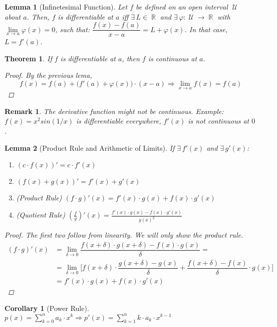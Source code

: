 \documentclass[12pt]{article}
\let\RA\Rightarrow
\DeclareMathOperator{\R}{\mathbb{R}}
\DeclareMathOperator{\U}{\mathcal{U}}
\newtheorem{theorem}{Theorem}[subsection]
\newtheorem{lemma}{Lemma}[subsection]
\newtheorem{corollary}{Corollary}[subsection]
\newtheorem{remark}{Remark}[subsection]
\begin{document}
\begin{lemma}[Infinetesimal Function]
  Let $f$ be defined on an open interval $\U$ about $a$. Then, $f$ is differentiable at $a$ iff $\exists\,L\in\R$ and $\exists\,\varphi:\U\to \R$ with $\lim\limits_{x\to a} \varphi(x)=0$, such that: $\dfrac{f(x)-f(a)}{x-a}=L+\varphi(x)$. In that case, $L=f'(a)$.
\end{lemma}

\begin{theorem}
  If $f$ is differentiable at $a$, then $f$ is continuous at $a$.
  \begin{proof}
    By the previous lema,
    $$f(x)=f(a)+\Big(f'(a)+\varphi(x)\Big)\cdot (x-a)\RA \lim_{x\to a} f(x)=f(a)$$
  \end{proof}
\end{theorem}

\begin{remark}
  The derivative function might not be continuous. Example: $f(x)=x^2sin(1/x)$ is differentiable everywhere, $f'(x)$ is not continuous at $0$.
\end{remark}

\begin{lemma}[Product Rule and Arithmetic of Limits]
  If $\exists\,f'(x)$ and $\exists\,g'(x)$:
  \begin{enumerate}
    \item $(c\cdot f(x))'=c\cdot f'(x)$
    \item $(f(x)+g(x))'=f'(x)+g'(x)$
    \item (Product Rule) $(f\cdot g)'(x)=f'(x)\cdot g(x)+f(x)\cdot g'(x)$
    \item (Quotient Rule) $\displaystyle\left(\frac{f}{g}\right)'(x)=\frac{f'(x)\cdot g(x)-f(x)\cdot g'(x)}{g(x)^2}$ 
  \end{enumerate}
  \begin{proof}
    The first two follow from linearity. We will only show the product rule.
    \begin{align*}
      (f\cdot g)'(x)&=\lim_{\delta\to 0}\dfrac{f(x+\delta)\cdot g(x+\delta)-f(x)\cdot g(x)}{\delta}=\\
      &=\lim_{\delta\to 0}\bigg[f(x+\delta)\cdot\dfrac{g(x+\delta)-g(x)}{\delta}+\dfrac{f(x+\delta)-f(x)}{\delta}\cdot g(x)\bigg]\\
      &=f'(x)\cdot g(x)+f(x)\cdot g'(x)
    \end{align*}
  \end{proof}
\end{lemma}

\begin{corollary}[Power Rule]
  $\displaystyle p(x)=\sum_{k=0}^n a_k\cdot x^k \RA p'(x)=\sum_{k=1}^n k\cdot a_k\cdot x^{k-1}$
\end{corollary}
\end{document}
